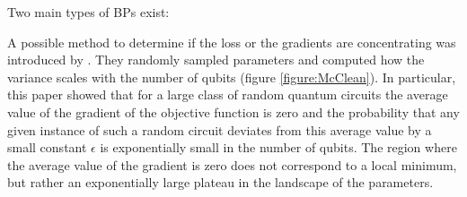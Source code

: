 Two main types of BPs exist:

A possible method to determine if the loss or the gradients are concentrating was introduced by \cite{McClean_2018}.
They randomly sampled parameters and computed how the variance scales with the number of qubits 
(figure \ref{figure:McClean}).
In particular, this paper showed that for a large class of random quantum circuits the average value of the gradient of the objective 
function is zero and the probability that any given instance of such a random circuit deviates from this average 
value by a small constant $\epsilon$ is exponentially small in the number of qubits.
The region where the average value of the gradient is zero does not correspond to a local minimum, but rather an 
exponentially large plateau in the landscape of the parameters.\\

